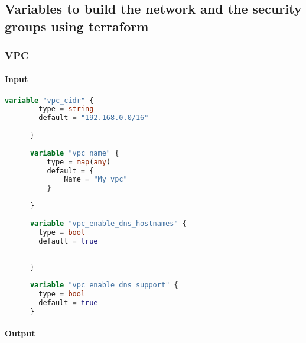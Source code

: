 
\chapter{}%
\label{ch:Bijlagen}

\section{
{Variables to build the network and the security groups using terraform}}
\label{sec:Variabelen voor het bouwen van het netwerk en de security groups met terraform}

\subsection{
{VPC}}
\label{sec:VPC}

\subsubsection{
{Input}}
\label{sec:Input}

\begin{lstlisting}[language=terraform]
    variable "vpc_cidr" {
        type = string
        default = "192.168.0.0/16"
        
      }
      
      variable "vpc_name" {
          type = map(any)
          default = {
              Name = "My_vpc"
          }
        
      }
      
      variable "vpc_enable_dns_hostnames" {
        type = bool
        default = true
      
        
      }
      
      variable "vpc_enable_dns_support" {
        type = bool
        default = true
      } 
\end{lstlisting}

\subsubsection{
{Output}}
\label{sec:Output}

